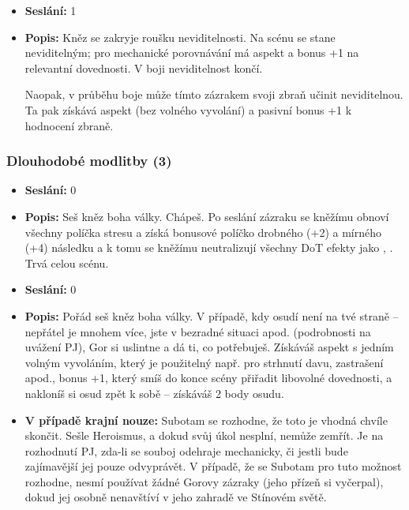 \documentclass[../main.tex]{subfiles}
\begin{document}
\begin{specialita}[Neviditelnost]
\begin{itemize}
	\item \textbf{Seslání:} 1
	\item \textbf{Popis:} Kněz se zakryje roušku neviditelnosti. Na scénu se stane neviditelným; pro mechanické porovnávání má aspekt  a bonus +1 na relevantní dovednosti. V boji neviditelnost končí.

	Naopak, v průběhu boje může tímto zázrakem svoji zbraň učinit neviditelnou. Ta pak získává aspekt  (bez volného vyvolání) a pasivní bonus +1 k hodnocení zbraně.
\end{itemize}
\end{specialita}

\subsubsection{Dlouhodobé modlitby (3)}

\begin{specialita}
\begin{itemize}
	\item \textbf{Seslání:} 0
	\item \textbf{Popis:} Seš kněz boha války. Chápeš. Po seslání zázraku se kněžímu obnoví všechny políčka stresu a získá bonusové políčko drobného (+2) a mírného (+4) následku a k tomu se kněžímu neutralizují všechny DoT efekty jako , . Trvá celou scénu.
\end{itemize}
\end{specialita}

\begin{specialita}[Heroismus]
\begin{itemize}
	\item \textbf{Seslání:} 0
	\item \textbf{Popis:} Pořád seš kněz boha války. V případě, kdy osudí není na tvé straně – nepřátel je mnohem více, jste v bezradné situaci apod. (podrobnosti na uvážení PJ), Gor si uslintne a dá ti, co potřebuješ. Získáváš aspekt  s jedním volným vyvoláním, který je použitelný např. pro strhnutí davu, zastrašení apod., bonus +1, který smíš do konce scény přiřadit libovolné dovednosti, a nakloníš si osud zpět k sobě – získáváš 2 body osudu.
	\item \textbf{V případě krajní nouze:} Subotam se rozhodne, že toto je vhodná chvíle skončit. Sešle Heroismus, a dokud svůj úkol nesplní, nemůže zemřít. Je na rozhodnutí PJ, zda-li se souboj odehraje mechanicky, či jestli bude zajímavější jej pouze odvyprávět. V případě, že se Subotam pro tuto možnost rozhodne, nesmí používat žádné Gorovy zázraky (jeho přízeň si vyčerpal), dokud jej osobně nenavštíví v jeho zahradě ve Stínovém světě.
\end{itemize}
\end{specialita}
\end{document}
